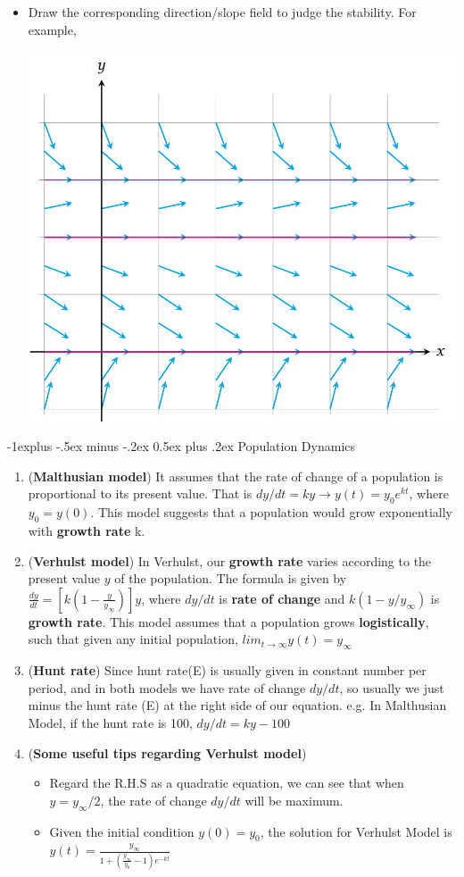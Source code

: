 \documentclass[10pt, landscape]{article}
\makeatletter
\renewcommand{\subsection}{\@startsection{subsection}{2}{0mm}%
                                {-1explus -.5ex minus -.2ex}%
                                {0.5ex plus .2ex}%
                                {\normalfont\normalsize\bfseries}}
\makeatother
\begin{document}
\begin{multicols}{4}
\begin{enumerate}
\begin{itemize}
        \item Draw the corresponding direction/slope field to judge the stability. For example,\\
        \centerline{\includegraphics[width=0.5\linewidth]{image/direction-field.png}}
    \end{itemize}
\end{enumerate}
\subsection{Population Dynamics}
\begin{enumerate}
    \item (\textbf{Malthusian model}) It assumes that the rate of change of a population is proportional to its present value. That is $dy/dt=ky\rightarrow y(t)=y_0e^{kt}$, where $y_0=y(0)$. This model suggests that a population would grow exponentially with \textbf{growth rate} k.
    \item (\textbf{Verhulst model}) In Verhulst, our \textbf{growth rate} varies according to the present value $y$ of the population. The formula is given by $\frac{dy}{dt}=[k(1-\frac{y}{y_\infty})]y$, where $dy/dt$ is \textbf{rate of change} and $k(1-y/y_\infty)$ is \textbf{growth rate}. This model assumes that a population grows \textbf{logistically}, such that given any initial population, $lim_{t\to \infty}y(t)=y_\infty$
    \item (\textbf{Hunt rate}) Since hunt rate(E) is usually given in constant number per period, and in both models we have rate of change $dy/dt$, so usually we just minus the hunt rate (E) at the right side of our equation. e.g. In Malthusian Model, if the hunt rate is 100, $dy/dt=ky-100$
    \item (\textbf{Some useful tips regarding Verhulst model})
    \begin{itemize}
        \item Regard the R.H.S as a quadratic equation, we can see that when $y=y_\infty/2$, the rate of change $dy/dt$ will be maximum.
        \item Given the initial condition $y(0)=y_0$, the solution for Verhulst Model is $y(t)=\frac{y_\infty}{1+(\frac{y_\infty}{y_0}-1)e^{-kt}}$
    \end{itemize}
\end{enumerate}


\end{multicols}
\end{document}

